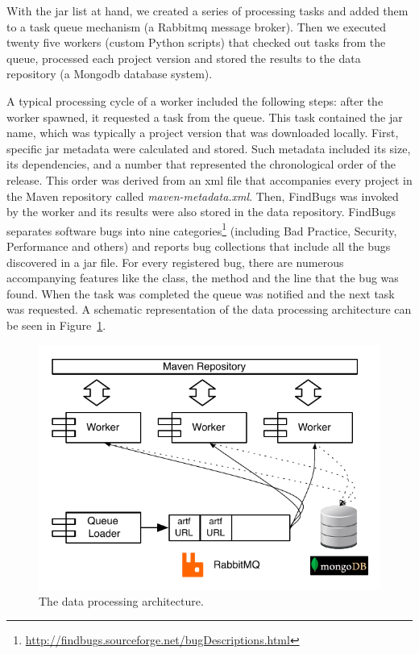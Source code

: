 \documentclass{sig-alternate}
\begin{document}
With the {\sc jar} list at hand, we created a series of processing tasks
and added them to a task queue mechanism (a Rabbit{\sc mq} message
broker). Then we executed twenty five workers (custom Python scripts)
that checked out tasks from the queue, processed each project version
and stored the results to the data
repository (a Mongo{\sc db} database system).

A typical processing cycle of a worker included the following steps: after
the worker spawned, it requested a task from the queue. This task contained
the {\sc jar} name, which was typically a project version that was downloaded locally.
First, specific {\sc jar} metadata were calculated and stored. Such metadata included
its size, its dependencies, and a number that represented the chronological order of the
release. This order was derived from an {\sc xml} file that
accompanies every project in the Maven repository called {\it
maven-metadata.xml}. Then, FindBugs was invoked by the worker and its results were
also stored in the data repository. 
FindBugs separates software bugs into nine
categories\footnote{\url{http://findbugs.sourceforge.net/bugDescriptions.html}}
(including Bad Practice, Security, Performance and others)
and reports bug collections that include all the bugs discovered in a
{\sc jar} file. For every registered bug, there are numerous accompanying features
like the class, the method and the line that the bug was found.
When the task was completed the queue
was notified and the next task was requested. A schematic representation of
the data processing architecture can be seen in Figure~\ref{fig:arch}.

\begin{figure} [h]
  \begin{center}
    \includegraphics[scale=0.73]{figures/arch.pdf}
  \end{center}
  \caption{The data processing architecture.}
  \label{fig:arch}
\end{figure}
\end{document}
